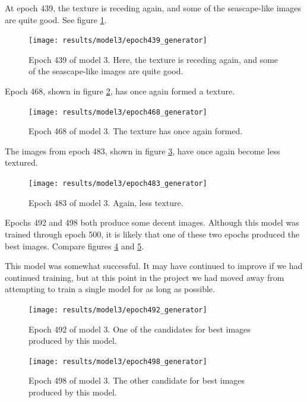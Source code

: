 \documentclass[11pt,letterpaper]{article}
\begin{document}
				At epoch 439, the texture is receding again, and some of the seascape-like images are quite good.
				See figure \ref{fig:cgm:epoch439generator}.
				\begin{figure}
					\centering
					\texttt{[image: results/model3/epoch439\_generator]}
					\caption[]{Epoch 439 of model 3. Here, the texture is receding again, and some of the seascape-like images are quite good.}
					\label{fig:cgm:epoch439generator}
				\end{figure}

				Epoch 468, shown in figure \ref{fig:cgm:epoch468generator}, has once again formed a texture.
				\begin{figure}
					\centering
					\texttt{[image: results/model3/epoch468\_generator]}
					\caption[]{Epoch 468 of model 3. The texture has once again formed.}
					\label{fig:cgm:epoch468generator}
				\end{figure}

				The images from epoch 483, shown in figure \ref{fig:cgm:epoch483generator}, have once again become less textured.
				\begin{figure}
					\centering
					\texttt{[image: results/model3/epoch483\_generator]}
					\caption[]{Epoch 483 of model 3. Again, less texture.}
					\label{fig:cgm:epoch483generator}
				\end{figure}

				Epochs 492 and 498 both produce some decent images.
				Although this model was trained through epoch 500, it is likely that one of these two epochs produced the best images.
				Compare figures \ref{fig:cgm:epoch492generator} and \ref{fig:cgm:epoch498generator}.

				This model was somewhat successful.
				It may have continued to improve if we had continued training, but at this point in the project we had moved away from attempting to train a single model for as long as possible.
				\begin{figure}
					\centering
					\texttt{[image: results/model3/epoch492\_generator]}
					\caption[]{Epoch 492 of model 3. One of the candidates for best images produced by this model.}
					\label{fig:cgm:epoch492generator}
				\end{figure}

				\begin{figure}
					\centering
					\texttt{[image: results/model3/epoch498\_generator]}
					\caption[]{Epoch 498 of model 3. The other candidate for best images produced by this model.}
					\label{fig:cgm:epoch498generator}
				\end{figure}
\end{document}
